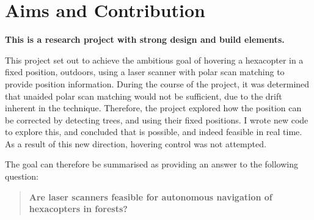 \documentclass[12pt,oneside,a4paper]{book}
\begin{document}
\cleardoublepage
\pagestyle{headings}
\tableofcontents

\mainmatter

\chapter{Aims and Contribution}
\label{cha:aims}


\textbf{This is a research project with strong design and build elements.}

This project set out to achieve the ambitious goal of hovering a
hexacopter in a fixed position, outdoors, using a laser scanner with
polar scan matching to provide position information. During the course
of the project, it was determined that unaided polar scan matching
would not be sufficient, due to the drift inherent in the
technique. Therefore, the project explored how the position can be
corrected by detecting trees, and using their fixed positions. I wrote
new code to explore this, and concluded that is possible, and indeed
feasible in real time. As a result of this new direction, hovering
control was not attempted.

The goal can therefore be summarised as providing an answer to the
following question:
\begin{quote}
  \textbf{Are laser scanners feasible for autonomous navigation of
    hexacopters in forests?}
\end{quote}
\end{document}
